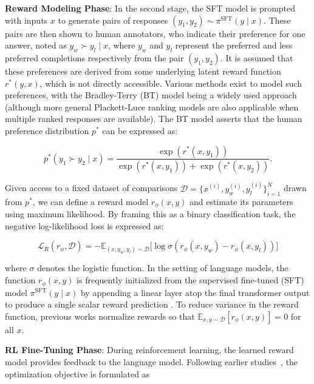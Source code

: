 \textbf{Reward Modeling Phase}: In the second stage, the SFT model is prompted with inputs $x$ to generate pairs of responses $(y_1, y_2) \sim \pi^\text{SFT}(y \mid x)$. These pairs are then shown to human annotators, who indicate their preference for one answer, noted as $y_w \succ y_l \mid x$, where $y_w$ and $y_l$ represent the preferred and less preferred completions respectively from the pair $(y_1, y_2)$. It is assumed that these preferences are derived from some underlying latent reward function $r^*(y, x)$, which is not directly accessible. Various methods exist to model such preferences, with the Bradley-Terry (BT) model \cite{bradley1952rankanalysis} being a widely used approach (although more general Plackett-Luce ranking models \citep{plackett1975analysis, luce2012individual} are also applicable when multiple ranked responses are available). The BT model asserts that the human preference distribution $p^*$ can be expressed as:

\begin{equation}\label{eq:bradley-terry}
    p^*(y_1\succ y_2 \mid x)=\frac{\exp\left(r^*(x, y_1)\right)}{\exp\left(r^*(x, y_1)\right) + \exp\left(r^*(x, y_2)\right)}.
\end{equation}

Given access to a fixed dataset of comparisons $\mathcal{D}=\bigl\{x^{(i)}, y_w^{(i)}, y_l^{(i)}\bigr\}_{i=1}^N$ drawn from $p^*$, we can define a reward model $r_{\phi}(x, y)$ and estimate its parameters using maximum likelihood. By framing this as a binary classification task, the negative log-likelihood loss is expressed as:

\begin{equation}\label{eq:reward_model}
    \mathcal{L}_R(r_{\phi}, \mathcal{D}) = -\mathbb{E}_{(x, y_w, y_l)\sim \mathcal{D}}\bigl[\log \sigma(r_{\phi}(x, y_w)- r_{\phi}(x, y_l))\bigr]
\end{equation}

where $\sigma$ denotes the logistic function. In the setting of language models, the function $r_{\phi}(x, y)$ is frequently initialized from the supervised fine-tuned (SFT) model $\pi^\text{SFT}(y \mid x)$ by appending a linear layer atop the final transformer output to produce a single scalar reward prediction \cite{ziegler2020finetuning}. To reduce variance in the reward function, previous works normalize rewards so that $\mathbb{E}_{x,y\sim \mathcal{D}}\left[r_\phi(x, y)\right] = 0$ for all $x$.

\textbf{RL Fine-Tuning Phase}: During reinforcement learning, the learned reward model provides feedback to the language model. Following earlier studies~\citep{jaques2017sequence, jaques2020human}, the optimization objective is formulated as

